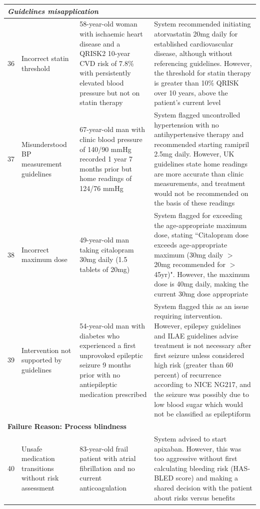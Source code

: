 {\begin{longtable}{p{}p{}p{}p{}}
                \midrule
                \multicolumn{4}{l}{\textit{Guidelines misapplication}} \\
                \midrule
                \hypertarget{vignette-36}{36} & Incorrect statin threshold & 58-year-old woman with ischaemic heart disease and a QRISK2 10-year CVD risk of 7.8\% with persistently elevated blood pressure but not on statin therapy & System recommended initiating atorvastatin 20mg daily for established cardiovascular disease, although without referencing guidelines. However, the threshold for statin therapy is greater than 10\% QRISK over 10 years, above the patient's current level \\
                \midrule
                \hypertarget{vignette-37}{37} & Misunderstood BP measurement guidelines & 67-year-old man with clinic blood pressure of 140/90 mmHg recorded 1 year 7 months prior but home readings of 124/76 mmHg & System flagged uncontrolled hypertension with no antihypertensive therapy and recommended starting ramipril 2.5mg daily. However, UK guidelines state home readings are more accurate than clinic measurements, and treatment would not be recommended on the basis of these readings \\
                \midrule
                \hypertarget{vignette-38}{38} & Incorrect maximum dose & 49-year-old man taking citalopram 30mg daily (1.5 tablets of 20mg) & System flagged for exceeding the age-appropriate maximum dose, stating ``Citalopram dose exceeds age-appropriate maximum (30mg daily $>$ 20mg recommended for $>$45yr)". However, the maximum dose is 40mg daily, making the current 30mg dose appropriate \\
                \midrule
                \hypertarget{vignette-39}{39} & Intervention not supported by guidelines & 54-year-old man with diabetes who experienced a first unprovoked epileptic seizure 9 months prior with no antiepileptic medication prescribed & System flagged this as an issue requiring intervention. However, epilepsy guidelines and ILAE guidelines advise treatment is not necessary after first seizure unless considered high risk (greater than 60 percent) of recurrence according to NICE NG217, and the seizure was possibly due to low blood sugar which would not be classified as epileptiform \\
                \midrule
                \multicolumn{4}{l}{\textbf{Failure Reason: Process blindness}} \\
                \midrule
                \hypertarget{vignette-40}{40} & Unsafe medication transitions without risk assessment & 83-year-old frail patient with atrial fibrillation and no current anticoagulation & System advised to start apixaban. However, this was too aggressive without first calculating bleeding risk (HAS-BLED score) and making a shared decision with the patient about risks versus benefits \\

\end{longtable}}
